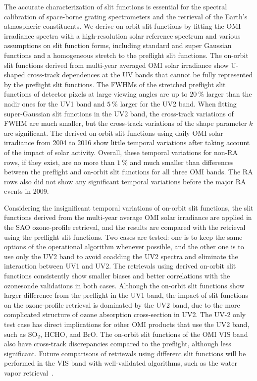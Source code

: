 \documentclass[amt,manuscript]{copernicus}
\begin{document}
\conclusions  %
The accurate characterization of slit functions is essential for the spectral calibration of space-borne grating spectrometers and the retrieval of the Earth’s atmospheric constituents.
We derive on-orbit slit functions by fitting the OMI irradiance spectra with a high-resolution solar reference spectrum and various assumptions on slit function forms, including standard and super Gaussian functions and a homogeneous stretch to the preflight slit functions. The on-orbit slit functions derived from multi-year averaged OMI solar irradiance show U-shaped cross-track dependences at the UV bands that cannot be fully represented by the preflight slit functions. The FWHMs of the stretched preflight slit functions of detector pixels at large viewing angles are up to $20~\%$ larger than the nadir ones for the UV1 band and $5~\%$ larger for the UV2 band. When fitting super-Gaussian slit functions in the UV2 band, the cross-track variations of FWHM are much smaller, but the cross-track variations of the shape parameter $k$ are significant. The derived on-orbit slit functions using daily OMI solar irradiance from 2004 to 2016 show little temporal variations after taking account of the impact of solar activity. Overall, these temporal variations for non-RA rows, if they exist, are no more than $1~\%$ and much smaller than differences between the preflight and on-orbit slit functions for all three OMI bands. The RA rows also did not show any significant temporal variations before the major RA events in 2009.

Considering the insignificant temporal variations of on-orbit slit functions, the slit functions derived from the multi-year average OMI solar irradiance are applied in the SAO ozone-profile retrieval, and the results are compared with the retrieval using the preflight slit functions. Two cases are tested: one is to keep the same options of the operational algorithm whenever possible, and the other one is to use only the UV2 band to avoid coadding the UV2 spectra and eliminate the interaction between UV1 and UV2. The retrievals using derived on-orbit slit functions consistently show smaller biases and better correlations with the ozonesonde validations in both cases. Although the on-orbit slit functions show larger difference from the preflight in the UV1 band, the impact of slit functions on the ozone-profile retrieval is dominated by the UV2 band, due to the more complicated structure of ozone absorption cross-section in UV2. The UV-2 only test case has direct implications for other OMI products that use the UV2 band, such as SO$_2$, HCHO, and BrO. The on-orbit slit functions of the OMI VIS band also have cross-track discrepancies compared to the preflight, although less significant. Future comparisons of retrievals using different slit functions will be performed in the VIS band with well-validated algorithms, such as the water vapor retrieval~\citep{wang2016validation}.
\end{document}
